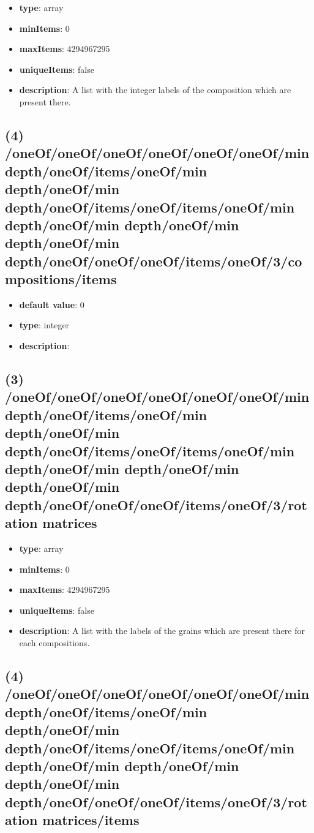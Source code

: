 \begin{itemize}[leftmargin=3em]\item {\bf type}: array
\item {\bf minItems}: 0
\item {\bf maxItems}: 4294967295
\item {\bf uniqueItems}: false
\item {\bf description}: A list with the integer labels of the composition which are present there.
\end{itemize}\subsection{(4) /oneOf/oneOf/oneOf/oneOf/oneOf/oneOf/min depth/oneOf/items/oneOf/min depth/oneOf/min depth/oneOf/items/oneOf/items/oneOf/min depth/oneOf/min depth/oneOf/min depth/oneOf/min depth/oneOf/oneOf/oneOf/items/oneOf/3/compositions/items}
\begin{itemize}[leftmargin=4em]\item {\bf default value}: 0
\item {\bf type}: integer
\item {\bf description}: 
\end{itemize}\subsection{(3) /oneOf/oneOf/oneOf/oneOf/oneOf/oneOf/min depth/oneOf/items/oneOf/min depth/oneOf/min depth/oneOf/items/oneOf/items/oneOf/min depth/oneOf/min depth/oneOf/min depth/oneOf/min depth/oneOf/oneOf/oneOf/items/oneOf/3/rotation matrices}
\begin{itemize}[leftmargin=3em]\item {\bf type}: array
\item {\bf minItems}: 0
\item {\bf maxItems}: 4294967295
\item {\bf uniqueItems}: false
\item {\bf description}: A list with the labels of the grains which are present there for each compositions.
\end{itemize}\subsection{(4) /oneOf/oneOf/oneOf/oneOf/oneOf/oneOf/min depth/oneOf/items/oneOf/min depth/oneOf/min depth/oneOf/items/oneOf/items/oneOf/min depth/oneOf/min depth/oneOf/min depth/oneOf/min depth/oneOf/oneOf/oneOf/items/oneOf/3/rotation matrices/items}
